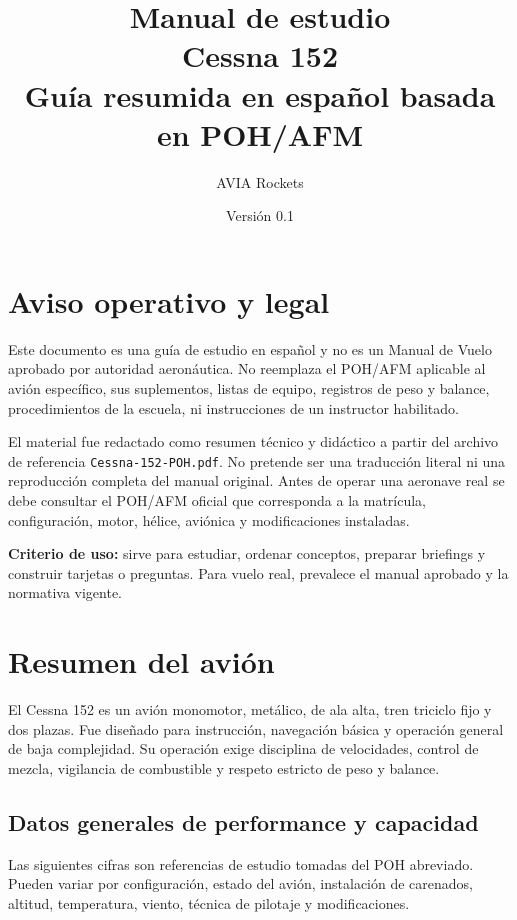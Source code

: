 \documentclass[11pt,oneside]{book}
\title{\Huge Manual de estudio\\Cessna 152\\\large Guía resumida en español basada en POH/AFM}
\author{AVIA Rockets}
\date{Versión 0.1}
\begin{document}
\frontmatter
\maketitle

\chapter*{Aviso operativo y legal}
Este documento es una guía de estudio en español y no es un Manual de Vuelo aprobado por autoridad aeronáutica. No reemplaza el POH/AFM aplicable al avión específico, sus suplementos, listas de equipo, registros de peso y balance, procedimientos de la escuela, ni instrucciones de un instructor habilitado.

El material fue redactado como resumen técnico y didáctico a partir del archivo de referencia \texttt{Cessna-152-POH.pdf}. No pretende ser una traducción literal ni una reproducción completa del manual original. Antes de operar una aeronave real se debe consultar el POH/AFM oficial que corresponda a la matrícula, configuración, motor, hélice, aviónica y modificaciones instaladas.

\textbf{Criterio de uso:} sirve para estudiar, ordenar conceptos, preparar briefings y construir tarjetas o preguntas. Para vuelo real, prevalece el manual aprobado y la normativa vigente.

\tableofcontents

\mainmatter

\chapter{Resumen del avión}

El Cessna 152 es un avión monomotor, metálico, de ala alta, tren triciclo fijo y dos plazas. Fue diseñado para instrucción, navegación básica y operación general de baja complejidad. Su operación exige disciplina de velocidades, control de mezcla, vigilancia de combustible y respeto estricto de peso y balance.

\section{Datos generales de performance y capacidad}

Las siguientes cifras son referencias de estudio tomadas del POH abreviado. Pueden variar por configuración, estado del avión, instalación de carenados, altitud, temperatura, viento, técnica de pilotaje y modificaciones.
\end{document}
